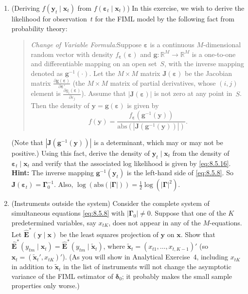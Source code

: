 \begin{enumerate}
\item (Deriving $f(\mathbf{y}_t \mid \mathbf{x}_t)$ from $f(\boldsymbol{\varepsilon}_t \mid \mathbf{x}_t)$)\quad
  In this exercise, we wish to derive the
  likelihood for observation~$t$ for the FIML model by the following fact from
  probability theory:

  \begin{quote}
  \textit{Change of Variable Formula:}\quad Suppose $\boldsymbol{\varepsilon}$ is a continuous $M$-dimensional random vector with density $f_{\boldsymbol{\varepsilon}}(\boldsymbol{\varepsilon})$ and
  $\mathbf{g}: \mathbb{R}^M \to \mathbb{R}^M$ is a one-to-one and differentiable mapping on an open set~$S$, with the inverse
  mapping denoted as $\mathbf{g}^{-1}(\cdot)$. Let the $M \times M$ matrix $\mathbf{J}(\boldsymbol{\varepsilon})$ be the Jacobian
  matrix $\frac{\partial \mathbf{g}(\boldsymbol{\varepsilon})}{\partial \boldsymbol{\varepsilon}'}$
  (the $M \times M$ matrix of partial derivatives, whose $(i, j)$
  element is $\frac{\partial g_i(\boldsymbol{\varepsilon})}{\partial \varepsilon_j}$).
  Assume that $|\mathbf{J}(\boldsymbol{\varepsilon})|$ is not zero at any point in~$S$.
  Then the density of $\mathbf{y} = \mathbf{g}(\boldsymbol{\varepsilon})$ is given by
  \[
    f(\mathbf{y}) = \frac{f_{\boldsymbol{\varepsilon}}(\mathbf{g}^{-1}(\mathbf{y}))}
    {\text{abs}(|\mathbf{J}(\mathbf{g}^{-1}(\mathbf{y}))|)}.
  \]
  \end{quote}

  (Note that $|\mathbf{J}(\mathbf{g}^{-1}(\mathbf{y}))|$ is a determinant, which may or may not be positive.)
  Using this fact, derive the density of $\mathbf{y}_t \mid \mathbf{x}_t$ from the density of
  $\boldsymbol{\varepsilon}_t \mid \mathbf{x}_t$
  and verify that the associated log likelihood is given by \eqref{eq:8.5.16}.
  \textbf{Hint:} The
  inverse mapping $\mathbf{g}^{-1}(\mathbf{y}_t)$ is the left-hand side of \eqref{eq:8.5.8}. So
  $\mathbf{J}(\boldsymbol{\varepsilon}_t) = \boldsymbol{\Gamma}_0^{-1}$. Also,
  $\log(\text{abs}(|\boldsymbol{\Gamma}|)) = \frac{1}{2}\log(|\boldsymbol{\Gamma}|^2)$.

\item (Instruments outside the system)\quad
  Consider the complete system of simultaneous equations \eqref{eq:8.5.8} with $|\boldsymbol{\Gamma}_0| \neq 0$. Suppose that one of the $K$ predetermined
  variables, say $x_{tK}$, does not appear in any of the $M$-equations. Let
  $\hat{\mathbf{E}}^*(\mathbf{y} \mid \mathbf{x})$ be
  the least squares projection of $\mathbf{y}$ on $\mathbf{x}$. Show that
  $\hat{\mathbf{E}}^*(y_{tm} \mid \mathbf{x}_t) = \hat{\mathbf{E}}^*(y_{tm} \mid \tilde{\mathbf{x}}_t)$,
  where $\tilde{\mathbf{x}}_t = (x_{t1}, \ldots, x_{t,K-1})'$ (so
  $\mathbf{x}_t = (\tilde{\mathbf{x}}_t', x_{tK})'$).
  (As you will show in Analytical Exercise~4, including $x_{tK}$ in addition to $\tilde{\mathbf{x}}_t$ in the list of instruments will
  not change the asymptotic variance of the FIML estimator of $\boldsymbol{\delta}_0$; it probably
  makes the small sample properties only worse.)


\end{enumerate}

